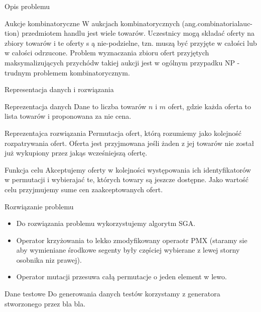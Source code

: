 \begin{frame}{Opis problemu}
    \begin{block}{Aukcje kombinatoryczne}
        W aukcjach kombinatorycznych (ang.combinatorialauc-tion) przedmiotem handlu jest wiele towarów. Uczestnicy mogą składać oferty na zbiory towarów i te oferty s ą nie-podzielne, tzn. muszą być przyjęte w całości lub w całości odrzucone. Problem wyznaczania zbioru ofert przyjętych maksymalizujących przychódw takiej aukcji jest w ogólnym przypadku NP -trudnym problemem kombinatorycznym.
    \end{block}
\end{frame}

\begin{frame}{Representacja danych i rozwiązania}

    \begin{block}{Reprezentacja danych}
        Dane to liczba towarów $n$ i $m$ ofert, gdzie każda oferta to lista towarów i proponowana za nie cena.
    \end{block}

    \begin{block}{Reprezentajca rozwiązania}
        Permutacja ofert, którą rozumiemy jako kolejność rozpatrywania ofert.
        Oferta jest przyjmowana jeśli żaden z jej towarów nie został już wykupiony przez jakąs wcześniejszą ofertę.
    \end{block}

    \begin{block}{Funkcja celu}
        Akceptujemy oferty w kolejności występowania ich identyfikatorów w permutacji i wybierajać te, których towary są jeszcze dostępne.
        Jako wartość celu przyjmujemy sume cen zaakceptowanych ofert.
    \end{block}
\end{frame}

\begin{frame}{Rozwiązanie problemu}
    \begin{itemize}
        \item Do rozwiązania problemu wykorzystujemy algorytm SGA.
        \item Operator krzyżowania to lekko zmodyfikowany operaotr PMX (staramy sie aby wymieniane środkowe segenty były częściej wybierane z lewej storny osobnika niz prawej).
        \item Operator mutacji przesuwa całą permutacje o jeden element w lewo.
    \end{itemize}
\end{frame}

\begin{frame}{Dane testowe}
    Do generowania danych testów korzystamy z generatora stworzonego przez bla bla.
\end{frame}


